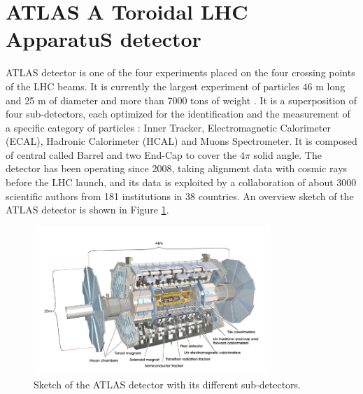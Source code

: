 \section{ATLAS A Toroidal LHC ApparatuS detector}
\label{chap2:ATLAS}
ATLAS detector is one of the four experiments placed on the four crossing points of the LHC beams. It is currently the largest experiment of particles 46 m long and 25 m of diameter and more than 7000 tons of weight \cite{ATLAS_Exp}. It is a superposition of four sub-detectors, each optimized for the identification and the measurement of a specific category of particles : Inner Tracker, Electromagnetic Calorimeter (ECAL), Hadronic Calorimeter (HCAL) and Muons Spectrometer. It is composed of central called Barrel and two End-Cap to cover the $4\pi$ solid angle. The detector has been operating since 2008, taking alignment data with cosmic rays before the LHC launch, and its data is exploited by a collaboration of about 3000 scientific authors from 181 institutions in 38 countries. An overview sketch of the ATLAS detector is shown in Figure \ref{fig:chap2:ATLAS:Img}.
\begin{figure}[H]
    \centering
    \includegraphics[width=0.8\textwidth]{Ch2/Img/ATLAS_sketch.png}
    \caption{Sketch of the ATLAS detector with its different sub-detectors.}
    \label{fig:chap2:ATLAS:Img}
\end{figure}

